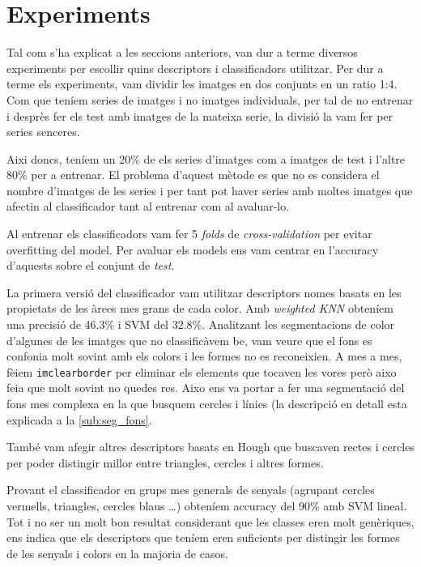 
\section{Experiments}%
\label{sec:experiments}

Tal com s'ha explicat a les seccions anteriors, van dur a terme diversos experiments per escollir quins descriptors
i classificadors utilitzar. Per dur a terme els experiments, vam dividir les imatges en dos conjunts en un ratio 1:4.
Com que teníem series de imatges i no imatges individuals, per tal de no entrenar i desprès fer els test amb imatges
de la mateixa serie, la divisió la vam fer per series senceres.

Aixi doncs, teníem un 20\% de els series d'imatges com a imatges de test i l'altre 80\% per a entrenar. El problema d'aquest
mètode es que no es considera el nombre d'imatges de les series i per tant pot haver series amb moltes imatges que
afectin al classificador tant al entrenar com al avaluar-lo.

Al entrenar els classificadors vam fer 5 \emph{folds} de \emph{cross-validation} per evitar overfitting del model. Per
avaluar els models ens vam centrar en l'accuracy d'aquests sobre el conjunt de \emph{test}.

La primera versió del classificador vam utilitzar descriptors nomes basats en les propietats de les àrees mes grans
de cada color. Amb \emph{weighted KNN} obteníem una precisió de 46.3\% i SVM del 32.8\%. Analitzant les segmentacions
de color d'algunes de les imatges que no classificàvem be, vam veure que el fons es confonia molt sovint amb els colors
i les formes no es reconeixien. A mes a mes, fèiem \texttt{imclearborder} per eliminar els elements que tocaven les vores
però aixo feia que molt sovint no quedes res. Aixo ens va portar a fer una segmentació del fons mes complexa en la
que busquem cercles i línies (la descripció en detall esta explicada a la \cref{sub:seg_fons}.

També vam afegir altres descriptors basats en Hough que buscaven rectes i cercles per poder distingir millor entre
triangles, cercles i altres formes.

Provant el classificador en grups mes generals de senyals (agrupant cercles vermells, triangles, cercles blaus \dots)
obteníem accuracy del 90\% amb SVM lineal. Tot i no ser un molt bon resultat considerant que les classes eren molt
genèriques, ens indica que els descriptors que teníem eren suficients per distingir les formes de les senyals i colors en la majoria de casos. 

